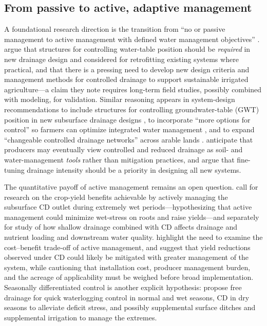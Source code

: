 \documentclass[11pt]{article}
\begin{document}
\subsection{From passive to active, adaptive management}
A foundational research direction is the transition from ``no or passive management to active management with defined water management objectives'' \parencite{Ayars2006b}. \textcite{Ayars2006b} argue that structures for controlling water-table position should be \emph{required} in new drainage design and considered for retrofitting existing systems where practical, and that there is a pressing need to develop new design criteria and management methods for controlled drainage to support sustainable irrigated agriculture---a claim they note requires long-term field studies, possibly combined with modeling, for validation. Similar reasoning appears in system-design recommendations to include structures for controlling groundwater-table (GWT) position in new subsurface drainage designs \parencite{Dukhovny2018}, to incorporate ``more options for control'' so farmers can optimize integrated water management \parencite{Ritzema2023}, and to expand ``changeable controlled drainage networks'' across arable lands \parencite{Mahmoud2021}. \textcite{Strock2011} anticipate that producers may eventually view controlled and reduced drainage as soil- and water-management \emph{tools} rather than mitigation practices, and argue that fine-tuning drainage intensity should be a priority in designing all new systems.

The quantitative payoff of active management remains an open question. \textcite{Watkins2024} call for research on the crop-yield benefits achievable by actively managing the subsurface CD outlet during extremely wet periods---hypothesizing that active management could minimize wet-stress on roots and raise yields---and separately for study of how shallow drainage combined with CD affects drainage and nutrient loading and downstream water quality. \textcite{Saadat2017} highlight the need to examine the cost--benefit trade-off of active management, and \textcite{Helmers2012} suggest that yield reductions observed under CD could likely be mitigated with greater management of the system, while cautioning that installation cost, producer management burden, and the acreage of applicability must be weighed before broad implementation. Seasonally differentiated control is another explicit hypothesis: \textcite{Asgari2021} propose free drainage for quick waterlogging control in normal and wet seasons, CD in dry seasons to alleviate deficit stress, and possibly supplemental surface ditches and supplemental irrigation to manage the extremes.
\end{document}
